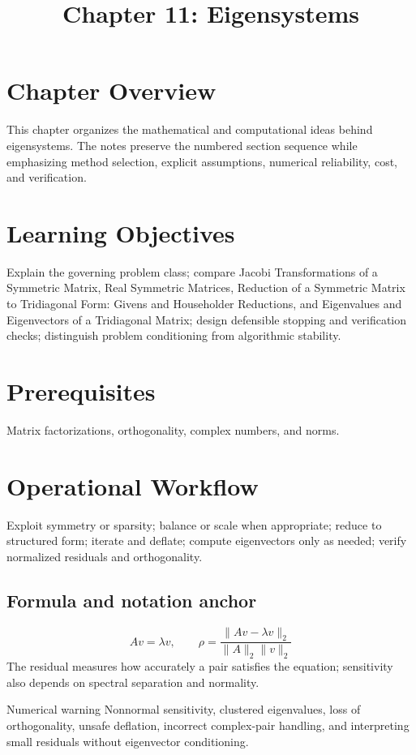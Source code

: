 \documentclass[10pt,letterpaper]{article}
\title{Chapter 11: Eigensystems}
\author{}
\date{}
\begin{document}
\maketitle

\section*{Chapter Overview}
This chapter organizes the mathematical and computational ideas behind eigensystems. The notes preserve the numbered section sequence while emphasizing method selection, explicit assumptions, numerical reliability, cost, and verification.

\section*{Learning Objectives}
Explain the governing problem class; compare Jacobi Transformations of a Symmetric Matrix, Real Symmetric Matrices, Reduction of a Symmetric Matrix to Tridiagonal Form: Givens and Householder Reductions, and Eigenvalues and Eigenvectors of a Tridiagonal Matrix; design defensible stopping and verification checks; distinguish problem conditioning from algorithmic stability.

\section*{Prerequisites}
Matrix factorizations, orthogonality, complex numbers, and norms.

\section*{Operational Workflow}
Exploit symmetry or sparsity; balance or scale when appropriate; reduce to structured form; iterate and deflate; compute eigenvectors only as needed; verify normalized residuals and orthogonality.

\subsection*{Formula and notation anchor}
\[
Av=\lambda v,\qquad \rho=\frac{\|Av-\lambda v\|_2}{\|A\|_2\|v\|_2}
\]
The residual measures how accurately a pair satisfies the equation; sensitivity also depends on spectral separation and normality.

\begin{warnbox}{Numerical warning}
Nonnormal sensitivity, clustered eigenvalues, loss of orthogonality, unsafe deflation, incorrect complex-pair handling, and interpreting small residuals without eigenvector conditioning.
\end{warnbox}
\end{document}
